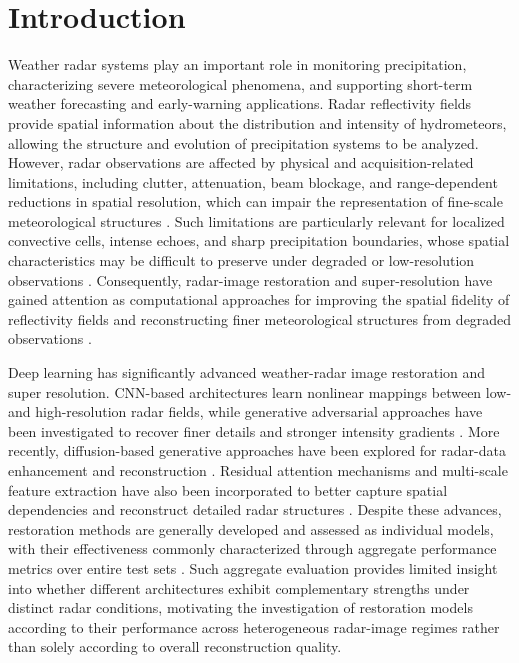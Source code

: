 \section{Introduction}

Weather radar systems play an important role in monitoring precipitation, characterizing severe meteorological phenomena, and supporting short-term weather forecasting and early-warning applications. Radar reflectivity fields provide spatial information about the distribution and intensity of hydrometeors, allowing the structure and evolution of precipitation systems to be analyzed. However, radar observations are affected by physical and acquisition-related limitations, including clutter, attenuation, beam blockage, and range-dependent reductions in spatial resolution, which can impair the representation of fine-scale meteorological structures \cite{green2024assessing}. Such limitations are particularly relevant for localized convective cells, intense echoes, and sharp precipitation boundaries, whose spatial characteristics may be difficult to preserve under degraded or low-resolution observations \cite{li2026fine}. Consequently, radar-image restoration and super-resolution have gained attention as computational approaches for improving the spatial fidelity of reflectivity fields and reconstructing finer meteorological structures from degraded observations \cite{shi2023radar}.


Deep learning has significantly advanced weather-radar image restoration and super resolution. CNN-based architectures learn nonlinear mappings between low- and high-resolution radar fields, while generative adversarial approaches have been investigated to recover finer details and stronger intensity gradients \cite{xu2025generalized}. More recently, diffusion-based generative approaches have been explored for radar-data enhancement and reconstruction \cite{peng2026multi}. Residual attention mechanisms and multi-scale feature extraction have also been incorporated to better capture spatial dependencies and reconstruct detailed radar structures \cite{yu2023weather}. Despite these advances, restoration methods are generally developed and assessed as individual models, with their effectiveness commonly characterized through aggregate performance metrics over entire test sets \cite{liu2025msrgan}. Such aggregate evaluation
 provides limited insight into whether different architectures exhibit complementary strengths under distinct radar conditions, motivating the investigation of restoration models according to their performance across heterogeneous radar-image regimes rather than solely according to overall reconstruction quality.

